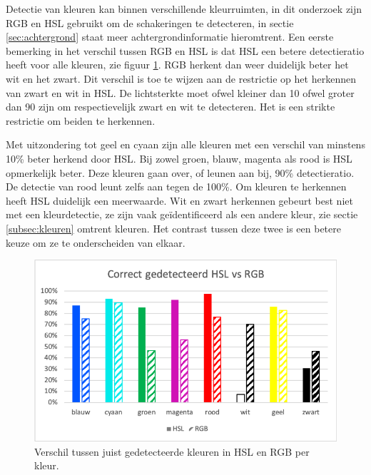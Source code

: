 Detectie van kleuren kan binnen verschillende kleurruimten, in dit onderzoek zijn RGB en HSL gebruikt om de schakeringen te detecteren, in sectie \ref{sec:achtergrond} staat meer achtergrondinformatie hieromtrent. Een eerste bemerking in het verschil tussen RGB en HSL is dat HSL een betere detectieratio heeft voor alle kleuren, zie figuur \ref{fig:HSLvsRGB}. RGB herkent dan weer duidelijk beter het wit en het zwart. Dit verschil is toe te wijzen aan de restrictie op het herkennen van zwart en wit in HSL. De lichtsterkte moet ofwel kleiner dan 10 ofwel groter dan 90 zijn om respectievelijk zwart en wit te detecteren. Het is een strikte restrictie om beiden te herkennen.

Met uitzondering tot geel en cyaan zijn alle kleuren met een verschil van minstens 10\% beter herkend door HSL. Bij zowel groen, blauw, magenta als rood is HSL opmerkelijk beter. Deze kleuren gaan over, of leunen aan bij, 90\% detectieratio. De detectie van rood leunt zelfs aan tegen de 100\%.
Om kleuren te herkennen heeft HSL duidelijk een meerwaarde. Wit en zwart herkennen gebeurt best niet met een kleurdetectie, ze zijn vaak geïdentificeerd als een andere kleur, zie sectie \ref{subsec:kleuren} omtrent kleuren. Het contrast tussen deze twee is een betere keuze om ze te onderscheiden van elkaar.

\begin{figure}
	\center
	\includegraphics{img/HSLvsRGB}
	\caption{Verschil tussen juist gedetecteerde kleuren in HSL en RGB per kleur.}
	\label{fig:HSLvsRGB}
\end{figure}

				